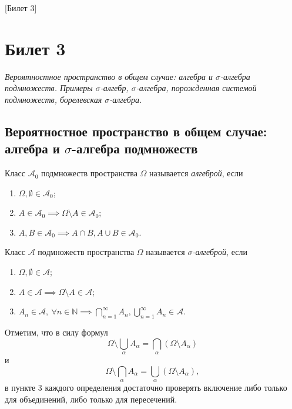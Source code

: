 [Билет 3]

\section{Билет 3}

\begin{center}
    \it Вероятностное пространство в общем случае: алгебра и $\sigma$-алгебра подмножеств.
    Примеры $\sigma$-алгебр, $\sigma$-алгебра, порожденная системой подмножеств, борелевская $\sigma$-алгебра.
\end{center}

\sectionbreak
\subsection{Вероятностное пространство в общем случае: алгебра и $\sigma$-алгебра подмножеств}

\begin{definition*}
    Класс $\mathcal{A}_0$ подмножеств пространства $\Omega$ называется {\it алгеброй}, если
    \begin{enumerate}
        \item $\Omega, \emptyset \in \mathcal{A}_0$;
        \item $A \in \mathcal{A}_0 \implies \Omega \setminus A \in \mathcal{A}_0$;
        \item $A, B \in \mathcal{A}_0 \implies A \cap B, A \cup B \in \mathcal{A}_0$.
    \end{enumerate}
\end{definition*}

\begin{definition*}
    Класс $\mathcal{A}$ подмножеств пространства $\Omega$ называется {\it $\sigma$-алгеброй}, если
    \begin{enumerate}
        \item $\Omega, \emptyset \in \mathcal{A}$;
        \item $A \in \mathcal{A} \implies \Omega \setminus A \in \mathcal{A}$;
        \item $A_n \in \mathcal{A},~\forall n\in \mathbb{N} \implies \bigcap\limits_{n = 1}^\infty A_n, \bigcup\limits_{n = 1}^\infty A_n \in \mathcal{A}$.
    \end{enumerate}
\end{definition*}

\noindent Отметим, что в силу формул
\[
    \Omega \setminus \bigcup\limits_{\alpha} A_\alpha = \bigcap\limits_{\alpha}(\Omega \setminus A_\alpha)
\]
и
\[
    \Omega \setminus \bigcap\limits_{\alpha} A_\alpha = \bigcup\limits_{\alpha}(\Omega \setminus A_\alpha),
\]
в пункте 3 каждого определения достаточно проверять включение либо только для объединений, либо только для пересечений.

